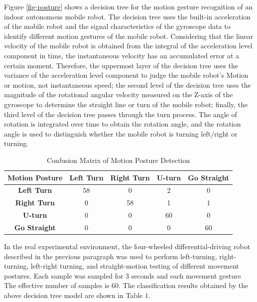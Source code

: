 \documentclass{llncs}
\begin{document}
Figure \ref{fig-posture} shows a decision tree for the motion gesture recognition of an indoor autonomous mobile robot. The decision tree uses the built-in acceleration of the mobile robot and the signal characteristics of the gyroscope data to identify different motion gestures of the mobile robot. Considering that the linear velocity of the mobile robot is obtained from the integral of the acceleration level component in time, the instantaneous velocity has an accumulated error at a certain moment. Therefore, the uppermost layer of the decision tree uses the variance of the acceleration level component to judge the mobile robot's Motion or motion, not instantaneous speed; the second level of the decision tree uses the magnitude of the rotational angular velocity measured on the Z-axis of the gyroscope to determine the straight line or turn of the mobile robot; finally, the third level of the decision tree passes through the turn process. The angle of rotation is integrated over time to obtain the rotation angle, and the rotation angle is used to distinguish whether the mobile robot is turning left/right or turning.

\begin{table}
	\label{table_conf}
	\caption{Confusion Matrix of Motion Posture Detection}
	\begin{center}
		\begin{tabular}{| c || c | c | c | c |}
			\hline
			\bfseries Motion Posture & \bfseries Left Turn & \bfseries Right Turn & \bfseries U-turn & \bfseries Go Straight\\
			\hline\hline
			\bfseries Left Turn & 58 & 0 & 2 & 0 \\
			\hline
			\bfseries Right Turn & 0 & 58 & 1 & 1 \\
			\hline
			\bfseries U-turn & 0 & 0 & 60 & 0 \\
			\hline
			\bfseries Go Straight & 0 & 0 & 0 & 60 \\
			\hline
		\end{tabular}
	\end{center}
\end{table}

In the real experimental environment, the four-wheeled differential-driving robot described in the previous paragraph was used to perform left-turning, right-turning, left-right turning, and straight-motion testing of different movement postures. Each sample was sampled for 3 seconds and each movement gesture The effective number of samples is 60. The classification results obtained by the above decision tree model are shown in Table $1$.
\end{document}
